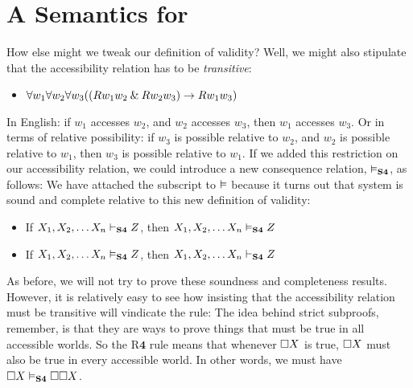 \section{A Semantics for \mlSfour}
\label{SemanticsS4}

How else might we tweak our definition of validity? Well, we might also stipulate that the accessibility relation has to be \emph{transitive}:
\begin{itemize}
	\item $\forall w_1\forall w_2\forall w_3 ((Rw_1w_2 \mathbin{\&} Rw_2w_3)\rightarrow Rw_1w_3)$
\end{itemize}
In English: if $w_1$ accesses $w_2$, and $w_2$ accesses $w_3$, then $w_1$ accesses $w_3$. Or in terms of relative possibility: if $w_3$ is possible relative to $w_2$, and $w_2$ is possible relative to $w_1$, then $w_3$ is possible relative to $w_1$. If we added this restriction on our accessibility relation, we could introduce a new consequence relation, $\vDash_{\mathbf{S4}}$, as follows:
We have attached the \mlSfour{} subscript to $\vDash$ because it turns out that system \mlSfour{} is sound and complete relative to this new definition of validity:
\begin{itemize}
	\item If $X_1,X_2, \dots X_n\vdash_{\mathbf{S4}}Z$, then $X_1,X_2, \dots X_n\vDash_{\mathbf{S4}}Z$
	\item If $X_1,X_2, \dots X_n\vDash_{\mathbf{S4}}Z$, then $X_1,X_2, \dots X_n\vdash_{\mathbf{S4}}Z$
\end{itemize}
As before, we will not try to prove these soundness and completeness results. However, it is relatively easy to see how insisting that the accessibility relation must be transitive will vindicate the \mlSfour{} rule:
The idea behind strict subproofs, remember, is that they are ways to prove things that must be true in all accessible worlds. So the R$\mathbf{4}$ rule means that whenever $\Box X$ is true, $\Box X$ must also be true in every accessible world. In other words, we must have $\Box X \vDash_{\mathbf{S4}} \Box\Box X$.


